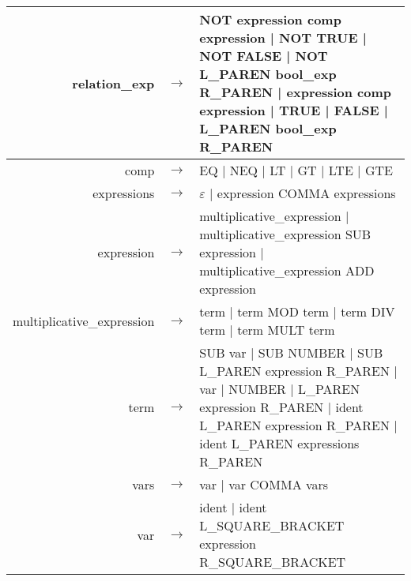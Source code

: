 \documentclass{article}[12pt]
\begin{document}
\begin{tabular}{r c l}
	relation\_exp & $\rightarrow$ &
		  NOT expression comp expression
		| NOT TRUE
		| NOT FALSE
		| NOT L\_PAREN bool\_exp R\_PAREN
		| expression comp expression
		| TRUE
		| FALSE
		| L\_PAREN bool\_exp R\_PAREN \\
	\hline

	comp & $\rightarrow$ &
		  EQ
		| NEQ
		| LT
		| GT
		| LTE
		| GTE \\
	\hline

	expressions & $\rightarrow$ &
		  $\varepsilon$
		| expression COMMA expressions \\
	\hline

	expression & $\rightarrow$ &
		  multiplicative\_expression
		| multiplicative\_expression SUB expression
		| multiplicative\_expression ADD expression \\
	\hline

	multiplicative\_expression & $\rightarrow$ &
		  term
		| term MOD term
		| term DIV term
		| term MULT term \\
	\hline

	term & $\rightarrow$ &
		  SUB var
		| SUB NUMBER
		| SUB L\_PAREN expression R\_PAREN
		| var
		| NUMBER
		| L\_PAREN expression R\_PAREN
		| ident L\_PAREN expression R\_PAREN
		| ident L\_PAREN expressions R\_PAREN \\
	\hline

	vars & $\rightarrow$ &
		  var
		| var COMMA vars \\
	\hline

	var & $\rightarrow$ &
		  ident
		| ident L\_SQUARE\_BRACKET expression R\_SQUARE\_BRACKET \\
\end{tabular}
\end{document}
